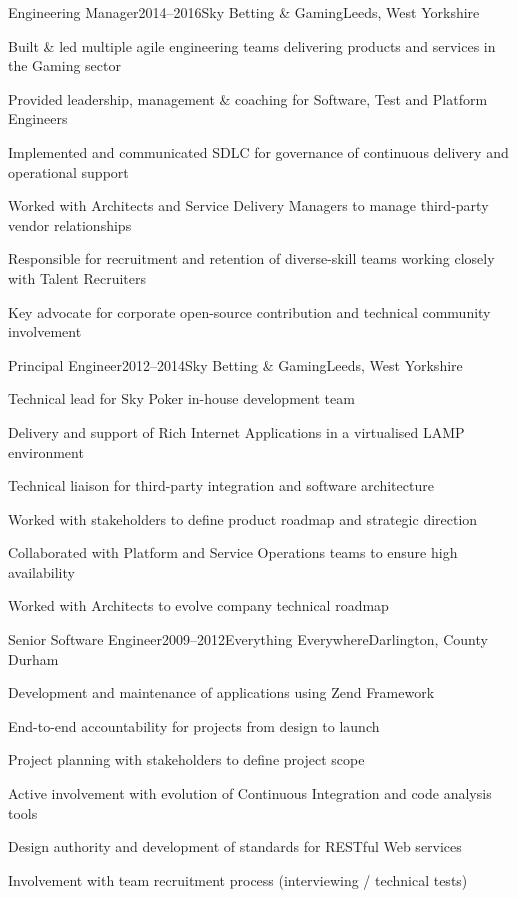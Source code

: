 \documentclass{cv}
\begin{document}

\begin{experience}{Engineering Manager}{2014--2016}{Sky Betting \& Gaming}{Leeds, West Yorkshire}
\item Built \& led multiple agile engineering teams delivering products and services in the Gaming sector
\item Provided leadership, management \& coaching for Software, Test and Platform Engineers
\item Implemented and communicated SDLC for governance of continuous delivery and operational support
\item Worked with Architects and Service Delivery Managers to manage third-party vendor relationships
\item Responsible for recruitment and retention of diverse-skill teams working closely with Talent Recruiters
\item Key advocate for corporate open-source contribution and technical community involvement
\end{experience}


\begin{experience}{Principal Engineer}{2012--2014}{Sky Betting \& Gaming}{Leeds, West Yorkshire}
\item Technical lead for Sky Poker in-house development team
\item Delivery and support of Rich Internet Applications in a virtualised LAMP environment
\item Technical liaison for third-party integration and software architecture
\item Worked with stakeholders to define product roadmap and strategic direction
\item Collaborated with Platform and Service Operations teams to ensure high availability
\item Worked with Architects to evolve company technical roadmap
\end{experience}


\begin{experience}{Senior Software Engineer}{2009--2012}{Everything Everywhere}{Darlington, County Durham}
\item Development and maintenance of applications using Zend Framework
\item End-to-end accountability for projects from design to launch
\item Project planning with stakeholders to define project scope
\item Active involvement with evolution of Continuous Integration and code analysis tools
\item Design authority and development of standards for RESTful Web services
\item Involvement with team recruitment process (interviewing / technical tests)
\end{experience}
\end{document}
